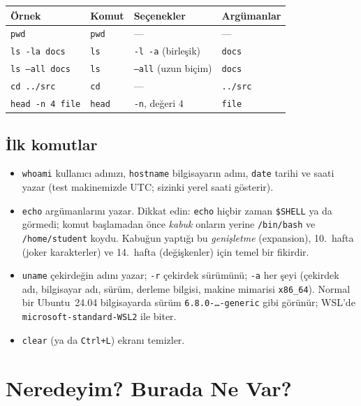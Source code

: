 \documentclass[11pt,a4paper]{article}
\newcommand{\cmd}[1]{\texttt{#1}}
\begin{document}
\begin{center}
\begin{tabular}{l l l l}
\toprule
\textbf{Örnek} & \textbf{Komut} & \textbf{Seçenekler} & \textbf{Argümanlar}\\
\midrule
\texttt{pwd} & \texttt{pwd} & --- & ---\\
\texttt{ls -la docs} & \texttt{ls} & \texttt{-l -a} (birleşik) & \texttt{docs}\\
\texttt{ls --all docs} & \texttt{ls} & \texttt{--all} (uzun biçim) & \texttt{docs}\\
\texttt{cd ../src} & \texttt{cd} & --- & \texttt{../src}\\
\texttt{head -n 4 file} & \texttt{head} & \texttt{-n}, değeri $4$ & \texttt{file}\\
\bottomrule
\end{tabular}
\end{center}

\subsection{İlk komutlar}
\label{sec:first}


\begin{itemize}
  \item \cmd{whoami} kullanıcı adınızı, \cmd{hostname} bilgisayarın adını, \cmd{date} tarihi ve saati yazar (test makinemizde UTC; sizinki yerel saati gösterir).
  \item \cmd{echo} argümanlarını yazar. Dikkat edin: \cmd{echo} hiçbir zaman \texttt{\$SHELL} ya da \texttt{\tl} görmedi; komut başlamadan önce \emph{kabuk} onların yerine \texttt{/bin/bash} ve \texttt{/home/student} koydu. Kabuğun yaptığı bu \emph{genişletme} (expansion), 10.\ hafta (joker karakterler) ve 14.\ hafta (değişkenler) için temel bir fikirdir.
  \item \cmd{uname} çekirdeğin adını yazar; \cmd{-r} çekirdek sürümünü; \cmd{-a} her şeyi (çekirdek adı, bilgisayar adı, sürüm, derleme bilgisi, makine mimarisi \texttt{x86\_64}). Normal bir Ubuntu~24.04 bilgisayarda sürüm \texttt{6.8.0-\ldots-generic} gibi görünür; WSL'de \texttt{microsoft-standard-WSL2} ile biter.
  \item \cmd{clear} (ya da \texttt{Ctrl+L}) ekranı temizler.
\end{itemize}

\section{Neredeyim? Burada Ne Var?}
\label{sec:ls}
\end{document}
